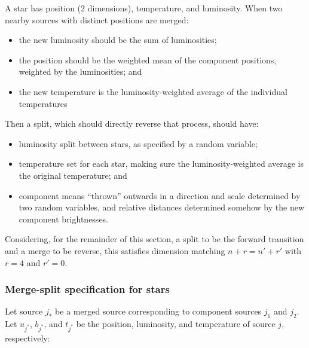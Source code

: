 \documentclass[11pt]{article}
\begin{document}
A star has position (2 dimensions), temperature, and luminosity.
When two nearby sources with distinct positions are merged:
\begin{itemize}
\item the new luminosity should be the sum of luminosities;
\item the position should be the weighted mean of the component positions,
weighted by the luminosities; and
\item the new temperature is the luminosity-weighted average of the
individual temperatures
\end{itemize}
Then a split, which should directly reverse that process, should have:
\begin{itemize}
\item luminosity split between stars, as specified by a random variable;
\item temperature set for each star, making sure the luminosity-weighted average
is the original temperature; and
\item component means {}``thrown'' outwards in a direction and scale determined
by two random variables, and relative distances determined somehow
by the new component brightnesses.
\end{itemize}
Considering, for the remainder of this section, a split to be the
forward transition and a merge to be reverse, this satisfies dimension
matching $n+r=n'+r'$ with $r=4$ and $r'=0$.


\subsubsection{Merge-split specification for stars\label{sub:merge-split-specification}}

Let source $j_{*}$ be a merged source corresponding to component
sources $j_{1}$ and $j_{2}$. Let $u_{j^*}$, $b_{j^*}$, and $t_{j^*}$
be the position, luminosity, and temperature of source $j$,
respectively:
\end{document}
